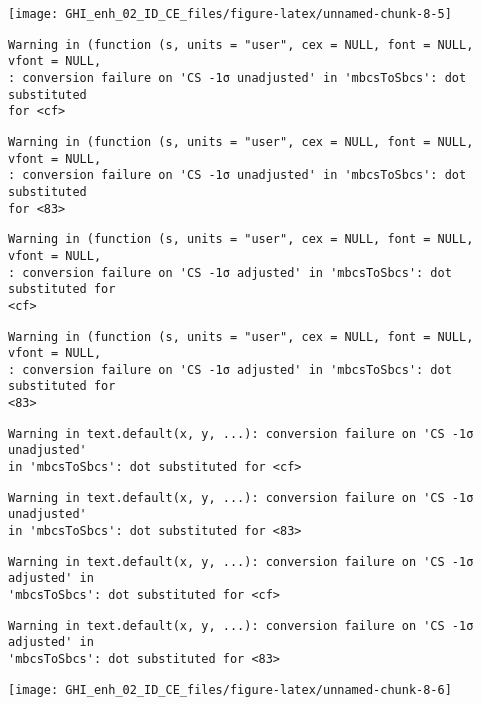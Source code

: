 \documentclass[
  10pt,
  a4paper,oneside]{article}
\begin{document}
\begin{center}\texttt{[image: GHI\_enh\_02\_ID\_CE\_files/figure-latex/unnamed-chunk-8-5]} \end{center}

\begin{verbatim}
Warning in (function (s, units = "user", cex = NULL, font = NULL, vfont = NULL,
: conversion failure on 'CS -1σ unadjusted' in 'mbcsToSbcs': dot substituted
for <cf>
\end{verbatim}

\begin{verbatim}
Warning in (function (s, units = "user", cex = NULL, font = NULL, vfont = NULL,
: conversion failure on 'CS -1σ unadjusted' in 'mbcsToSbcs': dot substituted
for <83>
\end{verbatim}

\begin{verbatim}
Warning in (function (s, units = "user", cex = NULL, font = NULL, vfont = NULL,
: conversion failure on 'CS -1σ adjusted' in 'mbcsToSbcs': dot substituted for
<cf>
\end{verbatim}

\begin{verbatim}
Warning in (function (s, units = "user", cex = NULL, font = NULL, vfont = NULL,
: conversion failure on 'CS -1σ adjusted' in 'mbcsToSbcs': dot substituted for
<83>
\end{verbatim}

\begin{verbatim}
Warning in text.default(x, y, ...): conversion failure on 'CS -1σ unadjusted'
in 'mbcsToSbcs': dot substituted for <cf>
\end{verbatim}

\begin{verbatim}
Warning in text.default(x, y, ...): conversion failure on 'CS -1σ unadjusted'
in 'mbcsToSbcs': dot substituted for <83>
\end{verbatim}

\begin{verbatim}
Warning in text.default(x, y, ...): conversion failure on 'CS -1σ adjusted' in
'mbcsToSbcs': dot substituted for <cf>
\end{verbatim}

\begin{verbatim}
Warning in text.default(x, y, ...): conversion failure on 'CS -1σ adjusted' in
'mbcsToSbcs': dot substituted for <83>
\end{verbatim}

\begin{center}\texttt{[image: GHI\_enh\_02\_ID\_CE\_files/figure-latex/unnamed-chunk-8-6]} \end{center}
\end{document}
